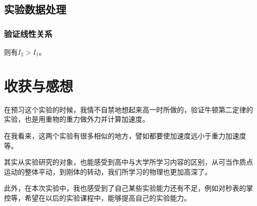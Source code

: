 \documentclass{ctexart}
\begin{document}
      \subsection{实验数据处理}
      \subsubsection{验证线性关系}
     
      则有$I_2>I_1$。
      \section{收获与感想}
      在预习这个实验的时候，我情不自禁地想起来高一时所做的，验证牛顿第二定律的实验，也是用重物的重力做外力并计算加速度。

      在我看来，这两个实验有很多相似的地方，譬如都要使加速度远小于重力加速度等。

      其实从实验研究的对象，也能感受到高中与大学所学习内容的区别，从可当作质点运动的整体平动，到刚体的转动，我们所学习的物理也更加高深了。

      此外，在本次实验中，我也感受到了自己某些实验能力还有不足，例如对秒表的掌控等，希望在以后的实验课程中，能够提高自己的实验能力。
\end{document}
